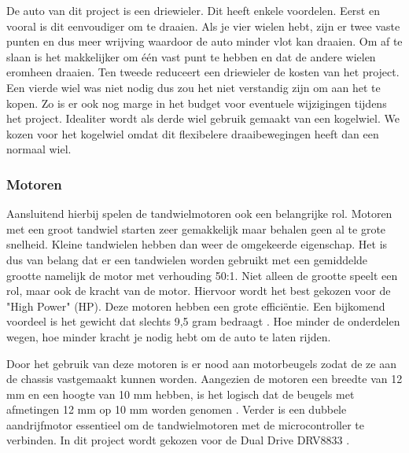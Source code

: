 \documentclass[a4paper,twoside,kulak]{kulakreport} %
\begin{document}
De auto van dit project is een driewieler. Dit heeft enkele voordelen. Eerst en vooral is dit eenvoudiger om te draaien. Als je vier wielen hebt, zijn er twee vaste punten en dus meer wrijving waardoor de auto minder vlot kan draaien. Om af te slaan is het makkelijker om één vast punt te hebben en dat de andere wielen eromheen draaien.
Ten tweede reduceert een driewieler de kosten van het project. Een vierde wiel was niet nodig dus zou het niet verstandig zijn om aan het te kopen. Zo is er ook nog marge in het budget voor eventuele wijzigingen tijdens het project. Idealiter wordt als derde wiel gebruik gemaakt van een kogelwiel. We kozen voor het kogelwiel omdat dit flexibelere draaibewegingen heeft dan een normaal wiel. 
\label{Wielen}


\subsubsection{Motoren}
Aansluitend hierbij spelen de tandwielmotoren ook een belangrijke rol. Motoren met een groot tandwiel starten zeer gemakkelijk maar behalen geen al te grote snelheid. Kleine tandwielen hebben dan weer de omgekeerde eigenschap. Het is dus van belang dat er een tandwielen worden gebruikt met een gemiddelde grootte namelijk de motor met verhouding 50:1. Niet alleen de grootte speelt een rol, maar ook de kracht van de motor. Hiervoor wordt het best gekozen voor de "High Power" (HP). Deze motoren hebben een grote efficiëntie.%
Een bijkomend voordeel is het gewicht dat slechts 9,5 gram bedraagt \cite{MicroMetalGearMotor50:1HP}. %
Hoe minder de onderdelen wegen, hoe minder kracht je nodig hebt om de auto te laten rijden. 

Door het gebruik van deze motoren is er nood aan motorbeugels zodat de ze aan de chassis  vastgemaakt kunnen worden. Aangezien de motoren een breedte van 12 mm en een hoogte van 10 mm hebben, is het logisch dat de beugels met afmetingen 12 mm op 10 mm worden genomen \cite{MicroMetalGearMotorBeugel}.
Verder is een dubbele aandrijfmotor essentieel om de tandwielmotoren met de microcontroller te verbinden. In dit project wordt gekozen voor de Dual Drive DRV8833 \cite{DualDriveDRV8833}. 
\label{Motoren}
\end{document}
